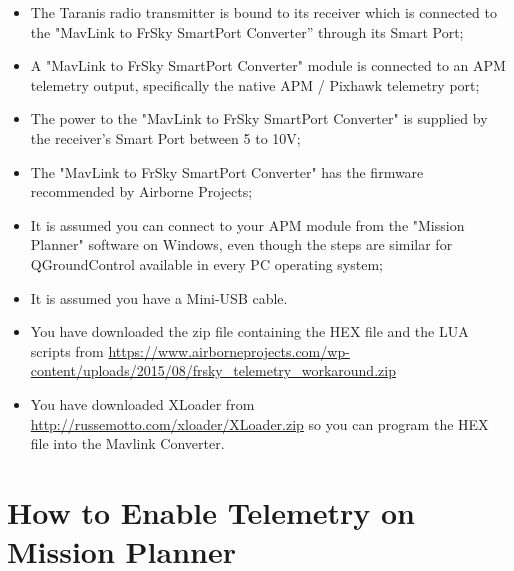 \documentclass[english]{article}
\begin{document}
\begin{itemize}

\item The Taranis radio transmitter is bound to its receiver which is connected to the "MavLink
to FrSky SmartPort Converter” through its Smart Port;

\item A "MavLink to FrSky SmartPort Converter" module is connected to an APM telemetry
output, specifically the native APM / Pixhawk telemetry port;

\item The power to the "MavLink to FrSky SmartPort Converter" is supplied by the receiver’s
Smart Port between 5 to 10V;

\item The "MavLink to FrSky SmartPort Converter" has the firmware recommended by Airborne
Projects;

\item It is assumed you can connect to your APM module from the "Mission Planner" software
on Windows, even though the steps are similar for QGroundControl available in every PC
operating system;

\item It is assumed you have a Mini-USB cable.

\item You have downloaded the zip file containing the HEX file and the LUA scripts from \url{https://www.airborneprojects.com/wp-content/uploads/2015/08/frsky\_telemetry\_workaround.zip}

\item You have downloaded XLoader from \url{http://russemotto.com/xloader/XLoader.zip} so you can program the HEX file into the Mavlink Converter.

\end{itemize}

\section{How to Enable Telemetry on Mission Planner}
\end{document}

